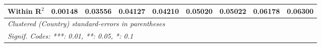 \begin{table}[htbp]
\begin{tabular}{lcccccccc}
      Within R$^2$                                                    & 0.00148  & 0.03556        & 0.04127        & 0.04210       & 0.05020  & 0.05022  & 0.06178                & 0.06300\\  
      \midrule \midrule
      \multicolumn{9}{l}{\emph{Clustered (Country) standard-errors in parentheses}}\\
      \multicolumn{9}{l}{\emph{Signif. Codes: ***: 0.01, **: 0.05, *: 0.1}}\\
   \end{tabular}
\end{table}


